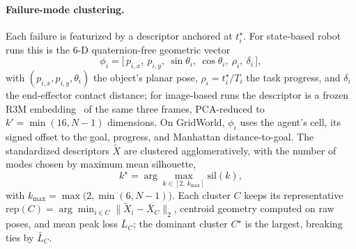 \documentclass[letterpaper]{article} %
\begin{document}
\paragraph{Failure-mode clustering.}
Each failure is featurized by a descriptor anchored at $t^\star_i$. For
state-based robot runs this is the 6-D quaternion-free geometric vector
\begin{equation}
\phi_i=\big[\,p_{i,x},\ p_{i,y},\ \sin\theta_i,\ \cos\theta_i,\
\rho_i,\ \delta_i\,\big],
\label{eq:desc}
\end{equation}
with $(p_{i,x},p_{i,y},\theta_i)$ the object's planar pose,
$\rho_i=t^\star_i/T_i$ the task progress, and $\delta_i$ the end-effector
contact distance; for image-based runs the descriptor is a frozen R3M
embedding~\citep{nair2022r3m} of the same three frames, PCA-reduced to
$k'=\min(16,N{-}1)$ dimensions. On GridWorld, $\phi_i$ uses the agent's cell,
its signed offset to the goal, progress, and Manhattan distance-to-goal. The
standardized descriptors $\tilde X$ are clustered agglomeratively, with the
number of modes chosen by maximum mean silhouette,
\begin{equation}
k^\star=\arg\max_{k\in[2,\,k_{\max}]}\mathrm{sil}(k),
\label{eq:kstar}
\end{equation}
with $k_{\max}=\max\big(2,\min(6,N{-}1)\big)$.
Each cluster $C$ keeps its representative
$\mathrm{rep}(C)=\arg\min_{i\in C}\|\tilde X_i-\bar X_C\|_2$, centroid
geometry computed on raw poses, and mean peak loss $\bar L_C$; the dominant
cluster $C^\star$ is the largest, breaking ties by $\bar L_C$.
\end{document}
